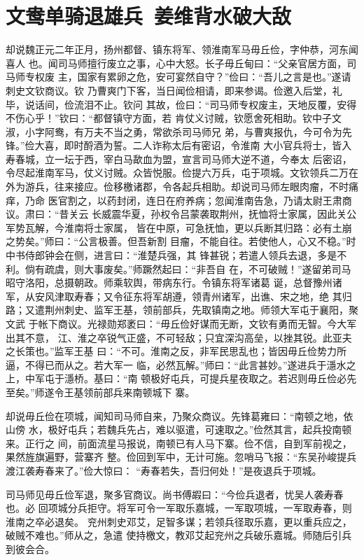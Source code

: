 \chapter{文鸯单骑退雄兵~姜维背水破大敌}

却说魏正元二年正月，扬州都督、镇东将军、领淮南军马毋丘俭，字仲恭，河东闻喜人
也。闻司马师擅行废立之事，心中大怒。长子毋丘甸曰：“父亲官居方面，司马师专权废
主，国家有累卵之危，安可宴然自守？”俭曰：“吾儿之言是也。”遂请刺史文钦商议。钦
乃曹爽门下客，当日闻俭相请，即来参谒。俭邀入后堂，礼毕，说话间，俭流泪不止。钦问
其故，俭曰：“司马师专权废主，天地反覆，安得不伤心乎！”钦曰：“都督镇守方面，若
肯仗义讨贼，钦愿舍死相助。钦中子文淑，小字阿鸯，有万夫不当之勇，常欲杀司马师兄
弟，与曹爽报仇，今可令为先锋。”俭大喜，即时酹酒为誓。二人诈称太后有密诏，令淮南
大小官兵将士，皆入寿春城，立一坛于西，宰白马歃血为盟，宣言司马师大逆不道，今奉太
后密诏，令尽起淮南军马，仗义讨贼。众皆悦服。俭提六万兵，屯于项城。文钦领兵二万在
外为游兵，往来接应。俭移檄诸郡，令各起兵相助。却说司马师左眼肉瘤，不时痛痒，乃命
医官割之，以药封闭，连日在府养病；忽闻淮南告急，乃请太尉王肃商议。肃曰：“昔关云
长威震华夏，孙权令吕蒙袭取荆州，抚恤将士家属，因此关公军势瓦解，今淮南将士家属，
皆在中原，可急抚恤，更以兵断其归路：必有土崩之势矣。”师曰：“公言极善。但吾新割
目瘤，不能自往。若使他人，心又不稳。”时中书侍郎钟会在侧，进言曰：“淮楚兵强，其
锋甚锐；若遣人领兵去退，多是不利。倘有疏虞，则大事废矣。”师蹶然起曰：“非吾自
在，不可破贼！”遂留弟司马昭守洛阳，总摄朝政。师乘软舆，带病东行。令镇东将军诸葛
诞，总督豫州诸军，从安风津取寿春；又令征东将军胡遵，领青州诸军，出谯、宋之地，绝
其归路；又遣荆州刺史、监军王基，领前部兵，先取镇南之地。师领大军屯于襄阳，聚文武
于帐下商议。光禄勋郑袤曰：“毋丘俭好谋而无断，文钦有勇而无智。今大军出其不意，
江、淮之卒锐气正盛，不可轻敌；只宜深沟高垒，以挫其锐。此亚夫之长策也。”监军王基
曰：“不可。淮南之反，非军民思乱也；皆因毋丘俭势力所逼，不得已而从之。若大军一
临，必然瓦解。”师曰：“此言甚妙。”遂进兵于濦水之上，中军屯于濦桥。基曰：“南
顿极好屯兵，可提兵星夜取之。若迟则毋丘俭必先至矣。”师遂令王基领前部兵来南顿城下
寨。

却说毋丘俭在项城，闻知司马师自来，乃聚众商议。先锋葛雍曰：“南顿之地，依山傍
水，极好屯兵；若魏兵先占，难以驱遣，可速取之。”俭然其言，起兵投南顿来。正行之
间，前面流星马报说，南顿已有人马下寨。俭不信，自到军前视之，果然旌旗遍野，营寨齐
整。俭回到军中，无计可施。忽哨马飞报：“东吴孙峻提兵渡江袭寿春来了。”俭大惊曰：
“寿春若失，吾归何处！”是夜退兵于项城。

司马师见毋丘俭军退，聚多官商议。尚书傅嘏曰：“今俭兵退者，忧吴人袭寿春也。必
回项城分兵拒守。将军可令一军取乐嘉城，一军取项城，一军取寿春，则淮南之卒必退矣。
兖州刺史邓艾，足智多谋；若领兵径取乐嘉，更以重兵应之，破贼不难也。”师从之，急遣
使持檄文，教邓艾起兖州之兵破乐嘉城。师随后引兵到彼会合。

